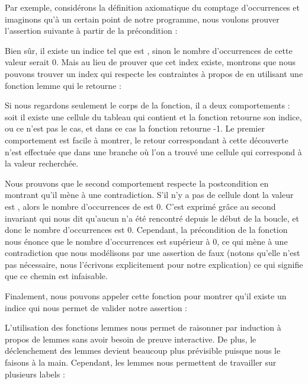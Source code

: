 Par exemple, considérons la définition axiomatique du comptage d'occurrences et
imaginons qu'à un certain point de notre programme, nous voulons prouver 
l'assertion suivante à partir de la précondition :




Bien sûr, il existe un indice  tel que  est
, sinon le nombre d'occurrences de cette valeur serait $0$.
Mais au lieu de prouver que cet index existe, montrons que nous pouvons trouver
un index qui respecte les contraintes à propos de  en utilisant
une fonction lemme qui le retourne :




Si nous regardons seulement le corps de la fonction, il a deux comportements :
soit il existe une cellule du tableau qui contient  et la fonction
retourne son indice, ou ce n'est pas le cas, et dans ce cas la fonction retourne
-1. Le premier comportement est facile à montrer, le retour correspondant à cette
découverte n'est effectuée que dans une branche où l'on a trouvé une cellule qui
correspond à la valeur recherchée.


Nous prouvons que le second comportement respecte la postcondition en montrant
qu'il mène à une contradiction. S'il n'y a pas de cellule dont la valeur est 
, alors le nombre d'occurrences de  est 0. C'est
exprimé grâce au second invariant qui nous dit qu'aucun  n'a été
rencontré depuis le début de la boucle, et donc le nombre d'occurrences est 0.
Cependant, la précondition de la fonction nous énonce que le nombre d'occurrences
est supérieur à 0, ce qui mène à une contradiction que nous modélisons par une
assertion de faux (notons qu'elle n'est pas nécessaire, nous l'écrivons 
explicitement pour notre explication) ce qui signifie que ce chemin est
infaisable.


Finalement, nous pouvons appeler cette fonction pour montrer qu'il existe un
indice qui nous permet de valider notre assertion :




L'utilisation des fonctions lemmes nous permet de raisonner par
induction à propos de lemmes sans avoir besoin de preuve interactive. De plus,
le déclenchement des lemmes devient beaucoup plus prévisible puisque nous le
faisons à la main. Cependant, les lemmes nous permettent de travailler sur
plusieurs labels :



